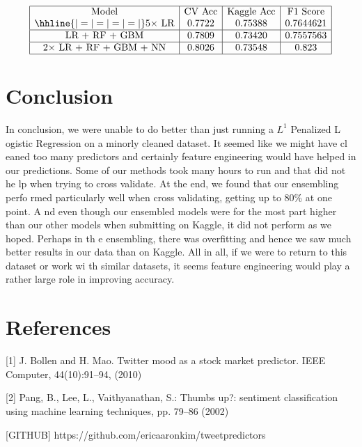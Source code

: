 \documentclass{article}
\begin{document}
$$\begin{array}{|c|c|c|c|}
\hline
\text{Model} & \text{CV Acc} & \text{Kaggle Acc} & \text{F1 Score} \\
\hhline{|=|=|=|=|}
\text{5$\times$ LR} & 0.7722 & 0.75388 & 0.7644621 \\
\hline
\text{LR + RF + GBM} & 0.7809 & 0.73420 & 0.7557563 \\
\hline
\text{$2\times$ LR + RF + GBM + NN} & 0.8026 & 0.73548 & 0.823 \\
\hline
\end{array}$$


\section{Conclusion}
In conclusion, we were unable to do better than just running a $L^1$ Penalized L
ogistic Regression on a minorly cleaned dataset. It seemed like we might have cl
eaned too many predictors and certainly feature engineering would have helped in
 our predictions. Some of our methods took many hours to run and that did not he
lp when trying to cross validate. At the end, we found that our ensembling perfo
rmed particularly well when cross validating, getting up to 80\% at one point. A
nd even though our ensembled models were for the most part higher than our other
 models when submitting on Kaggle, it did not perform as we hoped. Perhaps in th
e ensembling, there was overfitting and hence we saw much better results in our
data than on Kaggle. All in all, if we were to return to this dataset or work wi
th similar datasets, it seems feature engineering would play a rather large role
 in improving accuracy.


\newpage

\section{References}
[1] J. Bollen and H. Mao. Twitter mood as a stock market predictor. IEEE Computer, 44(10):91–94, (2010)

[2] Pang, B., Lee, L., Vaithyanathan, S.: Thumbs up?: sentiment classification using machine
learning techniques, pp. 79–86 (2002)

[GITHUB] https://github.com/ericaaronkim/tweetpredictors
\end{document}
